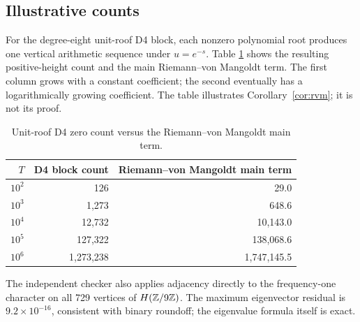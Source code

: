 \subsection{Illustrative counts}

For the degree-eight unit-roof D4 block, each nonzero polynomial root produces
one vertical arithmetic sequence under \(u=e^{-s}\). Table
\ref{tab:density} shows the resulting positive-height count and the main
Riemann--von Mangoldt term. The first column grows with a constant
coefficient; the second eventually has a logarithmically growing coefficient.
The table illustrates Corollary~\ref{cor:rvm}; it is not its proof.

\begin{table}[ht]
\centering
\caption{Unit-roof D4 zero count versus the Riemann--von Mangoldt main term.}
\label{tab:density}
\begin{tabular}{r@{\qquad}r@{\qquad}r}
\toprule
\(T\) & D4 block count & Riemann--von Mangoldt main term\\
\midrule
\(10^2\) & 126 & 29.0\\
\(10^3\) & 1,273 & 648.6\\
\(10^4\) & 12,732 & 10,143.0\\
\(10^5\) & 127,322 & 138,068.6\\
\(10^6\) & 1,273,238 & 1,747,145.5\\
\bottomrule
\end{tabular}
\end{table}

The independent checker also applies adjacency directly to the
frequency-one character on all 729 vertices of \(H(\mathbb{Z}/9\mathbb{Z})\). The maximum
eigenvector residual is \(9.2\times10^{-16}\), consistent with binary
roundoff; the eigenvalue formula itself is exact.

